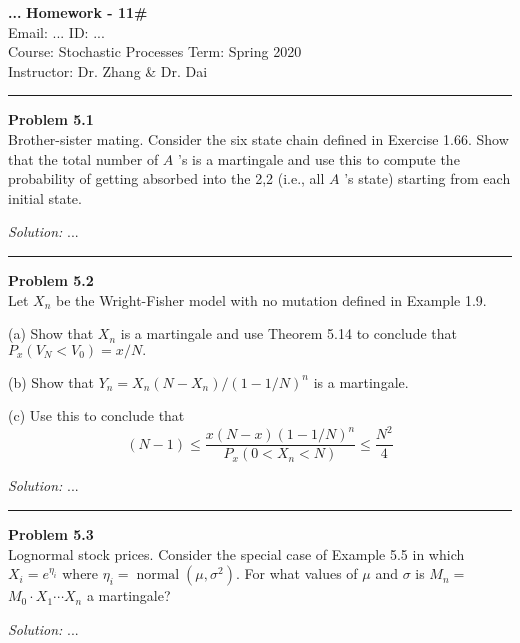 \documentclass[a4paper, 11pt]{article}
\newenvironment{problem}[2][Problem]
    { \begin{mdframed}[backgroundcolor=gray!20] \textbf{#1 #2} \\}
    {  \end{mdframed}}
\newenvironment{solution}
    {\textit{Solution:}}
    {}
\begin{document}
\noindent
\large\textbf{...} \hfill \textbf{Homework - 11\#}   \\
Email: ... \hfill ID: ...\\
\normalsize Course: Stochastic Processes  \hfill Term: Spring 2020\\
Instructor: Dr. Zhang \& Dr. Dai \\%
\noindent\rule{7in}{2.8pt}

\begin{problem}{5.1}
Brother-sister mating. Consider the six state chain defined in Exercise 1.66. Show that the total number of $A$ 's is a martingale and use this to compute the probability of getting absorbed into the 2,2 (i.e., all $A$ 's state) starting from each initial state.
\end{problem}
\begin{solution}
...
\end{solution} 

%
\noindent\rule{7in}{2.8pt}
\begin{problem}{5.2}
Let $X_{n}$ be the Wright-Fisher model with no mutation defined in Example
1.9.

(a) Show that $X_{n}$ is a martingale and use Theorem 5.14 to conclude that $P_{x}\left(V_{N}<V_{0}\right)=x / N . \quad$

(b) Show that $Y_{n}=X_{n}\left(N-X_{n}\right) /(1-1 / N)^{n}$ is a
martingale. 

(c) Use this to conclude that
$$
(N-1) \leq \frac{x(N-x)(1-1 / N)^{n}}{P_{x}\left(0<X_{n}<N\right)} \leq \frac{N^{2}}{4}
$$
\end{problem}
\begin{solution}
...
\end{solution} 

%
\noindent\rule{7in}{2.8pt}
\begin{problem}{5.3}
Lognormal stock prices. Consider the special case of Example 5.5 in which $X_{i}=e^{\eta_{i}}$ where $\eta_{i}=\operatorname{normal}\left(\mu, \sigma^{2}\right) .$ For what values of $\mu$ and $\sigma$ is $M_{n}=$
$M_{0} \cdot X_{1} \cdots X_{n}$ a martingale?
\end{problem}
\begin{solution}
...
\end{solution} 
\end{document}

